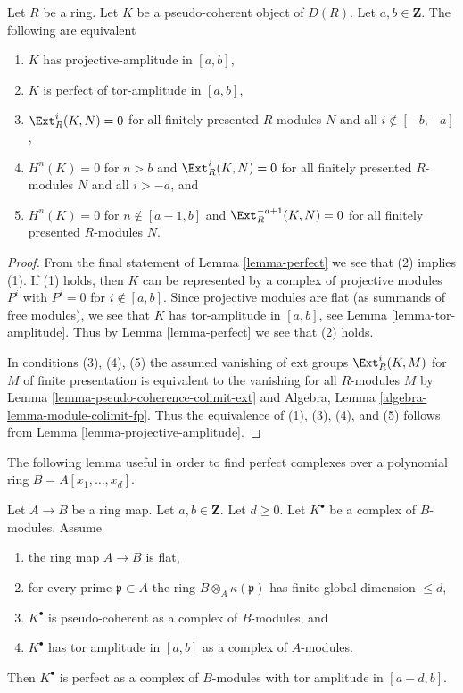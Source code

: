 \begin{lemma}
\label{lemma-projective-amplitude-pseudo-coherent}
Let $R$ be a ring. Let $K$ be a pseudo-coherent object of $D(R)$.
Let $a, b \in \mathbf{Z}$. The following are equivalent
\begin{enumerate}
\item $K$ has projective-amplitude in $[a, b]$,
\item $K$ is perfect of tor-amplitude in $[a, b]$,
\item $\Ext^i_R(K, N) = 0$ for all finitely presented $R$-modules $N$ and all
$i \not \in [-b, -a]$,
\item $H^n(K) = 0$ for $n > b$ and
$\Ext^i_R(K, N) = 0$ for all finitely presented $R$-modules $N$ and
all $i > -a$, and
\item $H^n(K) = 0$ for $n \not \in [a - 1, b]$ and
$\Ext^{-a + 1}_R(K, N) = 0$ for all finitely presented $R$-modules $N$.
\end{enumerate}
\end{lemma}

\begin{proof}
From the final statement of Lemma \ref{lemma-perfect} we see that
(2) implies (1).  If (1) holds, then $K$ can be represented by
a complex of projective modules $P^i$ with $P^i = 0$ for $i \not \in [a, b]$.
Since projective modules are flat (as summands of free modules), we see
that $K$ has tor-amplitude in $[a, b]$, see Lemma \ref{lemma-tor-amplitude}.
Thus by Lemma \ref{lemma-perfect} we see that (2) holds.

\medskip\noindent
In conditions (3), (4), (5) the assumed vanishing of ext groups
$\Ext^i_R(K, M)$ for $M$ of finite presentation is equivalent to the
vanishing for all $R$-modules $M$ by
Lemma \ref{lemma-pseudo-coherence-colimit-ext}
and Algebra, Lemma \ref{algebra-lemma-module-colimit-fp}.
Thus the equivalence of (1), (3), (4), and (5)
follows from Lemma \ref{lemma-projective-amplitude}.
\end{proof}

\noindent
The following lemma useful in order to find perfect complexes
over a polynomial ring $B = A[x_1, \ldots, x_d]$.

\begin{lemma}
\label{lemma-perfect-over-polynomial-ring}
Let $A \to B$ be a ring map. Let $a, b \in \mathbf{Z}$. Let $d \geq 0$.
Let $K^\bullet$ be a complex of $B$-modules. Assume
\begin{enumerate}
\item the ring map $A \to B$ is flat,
\item for every prime $\mathfrak p \subset A$ the ring
$B \otimes_A \kappa(\mathfrak p)$ has finite global dimension $\leq d$,
\item $K^\bullet$ is pseudo-coherent as a complex of $B$-modules, and
\item $K^\bullet$ has tor amplitude in $[a, b]$ as a complex
of $A$-modules.
\end{enumerate}
Then $K^\bullet$ is perfect as a complex of $B$-modules
with tor amplitude in $[a - d, b]$.
\end{lemma}

